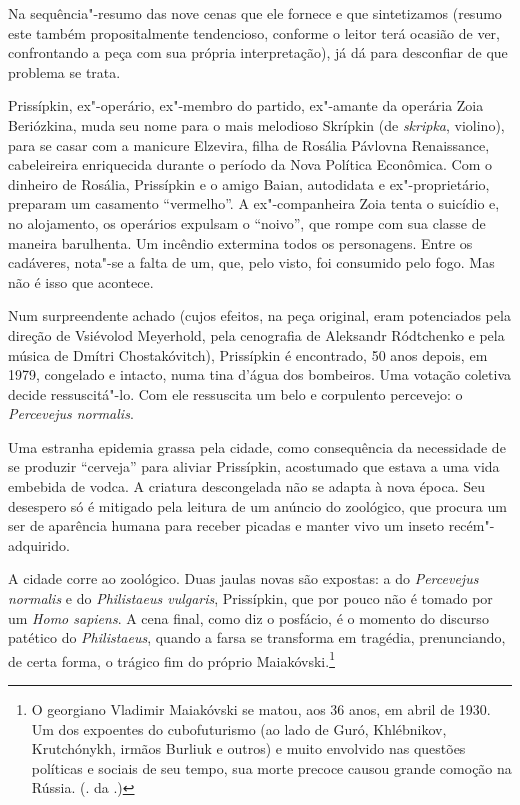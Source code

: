 Na sequência"-resumo das nove cenas que ele fornece e que sintetizamos
(resumo este também propositalmente tendencioso, conforme o leitor terá
ocasião de ver, confrontando a peça com sua própria interpretação), já
dá para desconfiar de que problema se trata.

Prissípkin, ex"-operário, ex"-membro do partido, ex"-amante da operária
Zoia Beriózkina, muda seu nome para o mais melodioso Skrípkin (de
\emph{skripka}, violino), para se casar com a manicure Elzevira, filha
de Rosália Pávlovna Renaissance, cabeleireira enriquecida durante o
período da Nova Política Econômica. Com o dinheiro de Rosália,
Prissípkin e o amigo Baian, autodidata e ex"-proprietário, preparam um
casamento ``vermelho''. A ex"-companheira Zoia tenta o suicídio e, no
alojamento, os operários expulsam o ``noivo'', que rompe com sua classe de
maneira barulhenta. Um incêndio extermina todos os personagens. Entre os
cadáveres, nota"-se a falta de um, que, pelo visto, foi consumido pelo
fogo. Mas não é isso que acontece.

Num surpreendente achado (cujos efeitos, na peça original, eram
potenciados pela direção de Vsiévolod Meyerhold, pela cenografia de
Aleksandr Ródtchenko e pela música de Dmítri Chostakóvitch), Prissípkin
é encontrado, 50 anos depois, em 1979, congelado e intacto, numa tina
d'água dos bombeiros. Uma votação coletiva decide ressuscitá"-lo. Com ele
ressuscita um belo e corpulento percevejo: o \emph{Percevejus normalis}.

Uma estranha epidemia grassa pela cidade, como consequência da
necessidade de se produzir ``cerveja'' para aliviar Prissípkin, acostumado
que estava a uma vida embebida de vodca. A criatura descongelada não se
adapta à nova época. Seu desespero só é mitigado pela leitura de um
anúncio do zoológico, que procura um ser de aparência humana para
receber picadas e manter vivo um inseto recém"-adquirido.

A cidade corre ao zoológico. Duas jaulas novas são expostas: a do
\emph{Percevejus normalis} e do \emph{Philistaeus vulgaris},
Prissípkin, que por pouco não é tomado por um \emph{Homo sapiens}. A
cena final, como diz o posfácio, é o momento do discurso patético do
\emph{Philistaeus}, quando a farsa se transforma em tragédia,
prenunciando, de certa forma, o trágico fim do próprio Maiakóvski.\footnote{O georgiano Vladimir Maiakóvski se matou, aos 36 anos, em abril de 1930. Um dos expoentes do cubofuturismo (ao lado de Guró, Khlébnikov, Krutchónykh, irmãos Burliuk e outros) e muito envolvido nas questões políticas e sociais de seu tempo, sua morte precoce causou grande comoção na Rússia. (. da .)}

